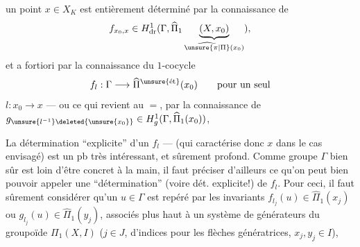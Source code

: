 un point $x\in X_K$ est entièrement déterminé par la connaissance de 
\[
f_{x_0,x}\in H^1_{\mathrm{dr}}(\Gamma,\widehat\Pi_1\underbrace{(X,x_0)}_{\widehat{\unsure{\pi|\Pi}}(x_0)}),
\]
et a fortiori par la connaissance du $1$-cocycle
\[
f_l:\Gamma\longrightarrow\widehat\Pi^{\unsure{\text{ét}}}(x_0)\qquad\text{pour un seul}
\]
$l:x_0\longrightarrow x$ --- ou ce qui revient au $=$, par la connaissance de $g_{\unsure{l^{-1}}\deleted{\unsure{x_0}}}\in H^1_g(\Gamma,\widehat\Pi_1(x_0))$, 

\unsure{\P} La détermination ``explicite'' d'un $f_l$ ---  (qui caractérise donc $x$ dans le cas envisagé) est un pb très intéressant, et sûrement profond. Comme   groupe $\Gamma$ bien sûr est loin d'être concret à la main, il faut préciser d'ailleurs ce qu'on peut bien pouvoir appeler une ``détermination'' (voire dét. explicite!) de $f_l$. Pour ceci, il faut sûrement considérer qu'un $u\in\Gamma$ est repéré par les invariants $f_{l_j}(u)\in\widehat\Pi_1(x_j)$ ou $g_{l_j}(u)\in\widehat\Pi_1(y_j)$, associés plus haut à un système  de générateurs  du groupoïde $\Pi_1(X,I)$ ($j\in J$,  d'indices pour les flèches génératrices, $x_j,y_j\in I$),
